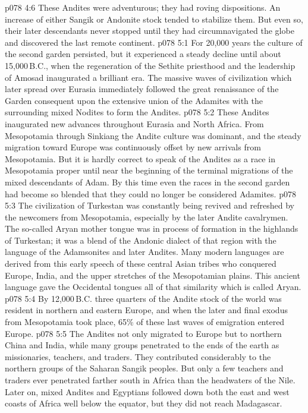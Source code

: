 \vs p078 4:6 These Andites were adventurous; they had roving dispositions. An increase of either Sangik or Andonite stock tended to stabilize them. But even so, their later descendants never stopped until they had circumnavigated the globe and discovered the last remote continent.
\vs p078 5:1 For 20,000 years the culture of the second garden persisted, but it experienced a steady decline until about 15,000\,B.C., when the regeneration of the Sethite priesthood and the leadership of Amosad inaugurated a brilliant era. The massive waves of civilization which later spread over Eurasia immediately followed the great renaissance of the Garden consequent upon the extensive union of the Adamites with the surrounding mixed Nodites to form the Andites.
\vs p078 5:2 These Andites inaugurated new advances throughout Eurasia and North Africa. From Mesopotamia through Sinkiang the Andite culture was dominant, and the steady migration toward Europe was continuously offset by new arrivals from Mesopotamia. But it is hardly correct to speak of the Andites as a race in Mesopotamia proper until near the beginning of the terminal migrations of the mixed descendants of Adam. By this time even the races in the second garden had become so blended that they could no longer be considered Adamites.
\vs p078 5:3 The civilization of Turkestan was constantly being revived and refreshed by the newcomers from Mesopotamia, especially by the later Andite cavalrymen. The so\hyp{}called Aryan mother tongue was in process of formation in the highlands of Turkestan; it was a blend of the Andonic dialect of that region with the language of the Adamsonites and later Andites. Many modern languages are derived from this early speech of these central Asian tribes who conquered Europe, India, and the upper stretches of the Mesopotamian plains. This ancient language gave the Occidental tongues all of that similarity which is called Aryan.
\vs p078 5:4 \pc By 12,000\,B.C. three quarters of the Andite stock of the world was resident in northern and eastern Europe, and when the later and final exodus from Mesopotamia took place, 65\% of these last waves of emigration entered Europe.
\vs p078 5:5 \pc The Andites not only migrated to Europe but to northern China and India, while many groups penetrated to the ends of the earth as missionaries, teachers, and traders. They contributed considerably to the northern groups of the Saharan Sangik peoples. But only a few teachers and traders ever penetrated farther south in Africa than the headwaters of the Nile. Later on, mixed Andites and Egyptians followed down both the east and west coasts of Africa well below the equator, but they did not reach Madagascar.
